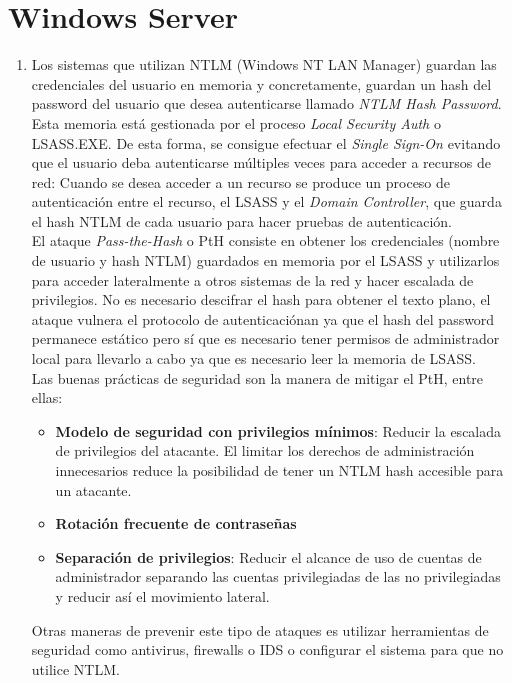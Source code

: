 \documentclass[10pt,a4paper]{article}
\begin{document}
\section*{Windows Server}
\begin{enumerate}[label=\textbf{\alph*)}, start=6]
\item Los sistemas que utilizan NTLM (Windows NT LAN Manager) guardan las credenciales del usuario en memoria y concretamente, guardan un hash del password del usuario que desea autenticarse llamado \textit{NTLM Hash Password}. Esta memoria está gestionada por el proceso \textit{Local Security Auth} o LSASS.EXE. De esta forma, se consigue efectuar el \textit{Single Sign-On} evitando que el usuario deba autenticarse múltiples veces para acceder a recursos de red: Cuando se desea acceder a un recurso se produce un proceso de autenticación entre el recurso, el LSASS y el \textit{Domain Controller}, que guarda el hash NTLM de cada usuario para hacer pruebas de autenticación.\\
El ataque \textit{Pass-the-Hash} o PtH consiste en obtener los credenciales (nombre de usuario y hash NTLM) guardados en memoria por el LSASS y utilizarlos para acceder lateralmente a otros sistemas de la red y hacer escalada de privilegios. No es necesario descifrar el hash para obtener el texto plano, el ataque vulnera el protocolo de autenticaciónan ya que el hash del password permanece estático pero sí que es necesario tener permisos de administrador local para llevarlo a cabo ya que es necesario leer la memoria de LSASS. \cite{PtH}\\
Las buenas prácticas de seguridad son la manera de mitigar el PtH, entre ellas:
\begin{itemize}
\item \textbf{Modelo de seguridad con privilegios mínimos}: Reducir la escalada de privilegios del atacante. El limitar los derechos de administración innecesarios reduce la posibilidad de tener un NTLM hash accesible para un atacante.
\item \textbf{Rotación frecuente de contraseñas}
\item \textbf{Separación de privilegios}: Reducir el alcance de uso de cuentas de administrador separando las cuentas privilegiadas de las no privilegiadas y reducir así el movimiento lateral.
\end{itemize}
Otras maneras de prevenir este tipo de ataques es utilizar herramientas de seguridad como antivirus, firewalls o IDS o configurar el sistema para que no utilice NTLM.\\



\end{enumerate}
\end{document}
